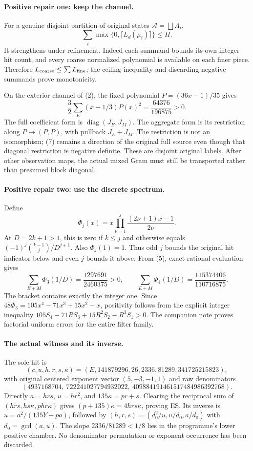\documentclass[10pt,a4paper]{article}
\begin{document}
\paragraph{Positive repair one: keep the channel.}
For a genuine disjoint partition of original states $\mathcal A=\bigsqcup A_i$,
\[
 \boxed{\sum_i\max\{0,\lceil L_d(\mu_i)\rceil\}\le H.}\tag{6}
\]
It strengthens under refinement. Indeed each summand bounds its own integer
hit count, and every coarse normalized polynomial is available on each finer
piece. Therefore $L_{\rm coarse}\le\sum L_{\rm fine}$; the ceiling inequality
and discarding negative summands prove monotonicity.

On the exterior channel of (2), the fixed polynomial $P=(36x-1)/35$ gives
\[
 \boxed{\frac32\sum_E(x-1/3)P(x)^2=\frac{64376}{196875}>0.}\tag{7}
\]
The full coefficient form is $\operatorname{diag}(J_E,J_M)$. The aggregate
form is its restriction along $P\mapsto(P,P)$, with pullback $J_E+J_M$.
The restriction is not an isomorphism; (7) remains a direction of the original
full source even though that diagonal restriction is negative definite.
These are disjoint original labels. After other observation maps, the actual
mixed Gram must still be transported rather than presumed block diagonal.

\paragraph{Positive repair two: use the discrete spectrum.}
Define
\[
 \Phi_j(x)=x\prod_{\nu=1}^j\frac{(2\nu+1)x-1}{2\nu}.
\]
At $D=2k+1>1$, this is zero if $k\le j$ and otherwise equals
$(-1)^j\binom{k-1}{j}/D^{j+1}$. Also $\Phi_j(1)=1$.
Thus odd $j$ bounds the original hit indicator below and even $j$ bounds it
above. From (5), exact rational evaluation gives
\[
 \boxed{\sum_{E+M}\Phi_3(1/D)=\frac{1297691}{2460375}>0,\qquad
 \sum_{E+M}\Phi_4(1/D)=\frac{115374406}{110716875}.}\tag{8}
\]
The bracket contains exactly the integer one. Since
$48\Phi_3=105x^4-71x^3+15x^2-x$, positivity follows from the explicit integer
inequality $105S_4-71RS_3+15R^2S_2-R^3S_1>0$.
The companion note proves factorial uniform errors for the entire filter family.

\newpage
\paragraph{The actual witness and its inverse.}
The sole hit is
\[
 (c,u,h,r,s,\kappa)=(E,141879296,26,2336,81289,341725215823),
\]
with original centered exponent vector $(5,-3,-1,1)$ and raw denominators
\[
 \boxed{(4937168704,\ 722241027794932022,\
 409884191461517484986392768).}\tag{9}
\]
Directly $a=hrs$, $u=hr^2$, and $135\kappa=pr+s$.
Clearing the reciprocal sum of $(hrs,hs\kappa,phr\kappa)$ gives
$(p+135)\kappa=4hrs\kappa$, proving ES. Its inverse is
$u=a^2/(135Y-pa)$, followed by
$(h,r,s)=(d_0^2/u,u/d_0,a/d_0)$ with $d_0=\gcd(a,u)$.
The slope $2336/81289<1/8$ lies in the programme's lower positive chamber.
No denominator permutation or exponent occurrence has been discarded.
\end{document}
